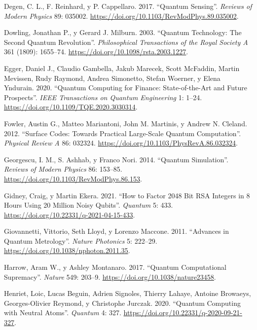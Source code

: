 \documentclass[
  11pt,
  letterpaper,
]{article}
\newlength{\cslhangindent}
\newenvironment{CSLReferences}[2] %
 {\begin{list}{}{%
  \setlength{\itemindent}{0pt}
  \setlength{\leftmargin}{0pt}
  \setlength{\parsep}{0pt}
  \ifodd #1
   \setlength{\leftmargin}{\cslhangindent}
   \setlength{\itemindent}{-1\cslhangindent}
  \fi
  \setlength{\itemsep}{#2\baselineskip}}}
 {\end{list}}
\begin{document}
\begin{CSLReferences}{1}{0}
Degen, C. L., F. Reinhard, y P. Cappellaro. 2017. {``Quantum Sensing''}.
\emph{Reviews of Modern Physics} 89: 035002.
\url{https://doi.org/10.1103/RevModPhys.89.035002}.

Dowling, Jonathan P., y Gerard J. Milburn. 2003. {``Quantum Technology:
The Second Quantum Revolution''}. \emph{Philosophical Transactions of
the Royal Society A} 361 (1809): 1655--74.
\url{https://doi.org/10.1098/rsta.2003.1227}.

Egger, Daniel J., Claudio Gambella, Jakub Marecek, Scott McFaddin,
Martin Mevissen, Rudy Raymond, Andrea Simonetto, Stefan Woerner, y Elena
Yndurain. 2020. {``Quantum Computing for Finance: State-of-the-Art and
Future Prospects''}. \emph{IEEE Transactions on Quantum Engineering} 1:
1--24. \url{https://doi.org/10.1109/TQE.2020.3030314}.

Fowler, Austin G., Matteo Mariantoni, John M. Martinis, y Andrew N.
Cleland. 2012. {``Surface Codes: Towards Practical Large-Scale Quantum
Computation''}. \emph{Physical Review A} 86: 032324.
\url{https://doi.org/10.1103/PhysRevA.86.032324}.

Georgescu, I. M., S. Ashhab, y Franco Nori. 2014. {``Quantum
Simulation''}. \emph{Reviews of Modern Physics} 86: 153--85.
\url{https://doi.org/10.1103/RevModPhys.86.153}.

Gidney, Craig, y Martin Ekera. 2021. {``How to Factor 2048 Bit RSA
Integers in 8 Hours Using 20 Million Noisy Qubits''}. \emph{Quantum} 5:
433. \url{https://doi.org/10.22331/q-2021-04-15-433}.

Giovannetti, Vittorio, Seth Lloyd, y Lorenzo Maccone. 2011. {``Advances
in Quantum Metrology''}. \emph{Nature Photonics} 5: 222--29.
\url{https://doi.org/10.1038/nphoton.2011.35}.

Harrow, Aram W., y Ashley Montanaro. 2017. {``Quantum Computational
Supremacy''}. \emph{Nature} 549: 203--9.
\url{https://doi.org/10.1038/nature23458}.

Henriet, Loic, Lucas Beguin, Adrien Signoles, Thierry Lahaye, Antoine
Browaeys, Georges-Olivier Reymond, y Christophe Jurczak. 2020.
{``Quantum Computing with Neutral Atoms''}. \emph{Quantum} 4: 327.
\url{https://doi.org/10.22331/q-2020-09-21-327}.


\end{CSLReferences}
\end{document}

